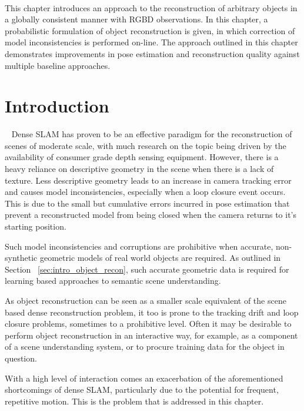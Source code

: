 ~\label{chap:probobj}
\begin{chapterabstract}
This chapter introduces an approach to the reconstruction of arbitrary objects 
in a globally consistent manner with RGBD observations. In this chapter, a 
probabilistic formulation of object reconstruction is given, in which correction 
of model inconsistencies is performed on-line. The approach outlined in this 
chapter demonstrates improvements in pose estimation and reconstruction quality 
against multiple baseline approaches.
\end{chapterabstract}

\section{Introduction}
~\label{sec:probobj_introduction}
Dense SLAM has proven to be an effective paradigm for the reconstruction of 
scenes of moderate scale, with much research on the topic being driven by the 
availability of consumer grade depth sensing equipment. However, there is a 
heavy reliance on descriptive geometry in the scene when there is a lack of 
texture. Less descriptive geometry leads to an increase in camera tracking 
error and causes model inconsistencies, especially when a loop closure event 
occurs. This is due to the small but cumulative errors incurred in pose 
estimation that prevent a reconstructed model from being closed when the 
camera returns to it's starting position.

Such model inconsistencies and corruptions are prohibitive when accurate, non-synthetic 
geometric models of real world objects are required. As outlined in Section
~\ref{sec:intro_object_recon}, such accurate geometric data is required for learning 
based approaches to semantic scene understanding.

As object reconstruction can be seen as a smaller scale equivalent of the scene
based dense reconstruction problem, it too is prone to the tracking drift and
loop closure problems, sometimes to a prohibitive level. Often it may be
desirable to perform object reconstruction in an interactive way, for example,
as a component of a scene understanding system, or to procure training data for
the object in question.

With a high level of interaction comes an exacerbation of the aforementioned
shortcomings of dense SLAM, particularly due to the potential for frequent,
repetitive motion. This is the problem that is addressed in this chapter.

